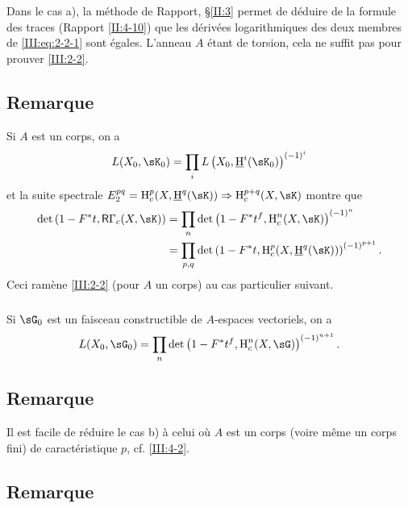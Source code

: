 Dans le cas a), la méthode de Rapport, \S\ref{II:3} permet de déduire de 
la formule des traces (Rapport \ref{II:4-10}) que les dérivées logarithmiques 
des deux membres de \eqref{III:eq:2-2-1} sont égales. L'anneau $A$ étant de 
torsion, cela ne suffit pas pour prouver \ref{III:2-2}. 





\subsection{Remarque}\label{III:2-4}

Si $A$ est un corps, on a 
\[
  L(X_0,\sK_0) = \prod_i L\left(X_0,\underline\h^i(\sK_0)\right)^{(-1)^i}
\]
et la suite spectrale 
$E_2^{p q} = \h_c^p(X,\underline\h^q(\sK))\Rightarrow \h_c^{p+q}(X,\sK)$ montre 
que 
\begin{align*}
  \det\left(1-F^* t, \R\Gamma_c(X,\sK)\right) 
    &= \prod_n \det\left(1-F^* t^f,\h_c^n(X,\sK)\right)^{(-1)^n} \\
    &= \prod_{p,q} \det\left(1-F^* t,\h_c^p(X,\underline\h^q(\sK))\right)^{(-1)^{p+1}} \text{.}
\end{align*}
Ceci ramène \ref{III:2-2} (pour $A$ un corps) au cas particulier suivant. 


\subsubsection{}\label{III:2-4-1}

Si $\sG_0$ est un faisceau constructible de $A$-espaces vectoriels, on a 
\[
  L(X_0,\sG_0) = \prod_n \det\left(1-F^* t^f,\h_c^n(X,\sG)\right)^{(-1)^{n+1}} \text{.}
\]





\subsection{Remarque}\label{III:2-5}

Il est facile de réduire le cas b) à celui où $A$ est un corps (voire 
même un corps fini) de caractéristique $p$, cf. \ref{III:4-2}. 





\subsection{Remarque}\label{III:2-6}

